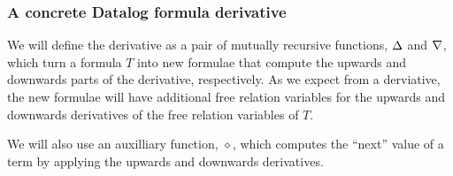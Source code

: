 \subsubsection{A concrete Datalog formula derivative}

We will define the derivative as a pair of mutually recursive functions,
$\Delta$ and $\nabla$, which turn a formula $T$ into new formulae that compute
the upwards and downwards parts of the derivative, respectively. As we expect
from a derviative, the new formulae will have additional free relation variables
for the upwards and downwards derivatives of the free relation variables of $T$.

\newcommand{\bothdiff}{\diamond}

We will also use an auxilliary function, $\bothdiff$, which computes the
``next'' value of a term by applying the upwards and downwards derivatives.



